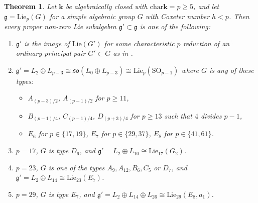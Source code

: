 \documentclass[11pt,a4paper,reqno]{amsart}
\newtheorem{theorem}[subsection]{Theorem}
\theoremstyle{definition}
\newcommand{\bk}{\mathbf{k}}
\numberwithin{equation}{section}
\newcommand{\charr}{\mathrm{char}}
\newcommand{\fg}{\mathfrak{g}}
\newcommand{\fso}{\mathfrak{so}}
\newcommand{\Lie}{\mathrm{Lie}}
\newcommand{\SO}{\mathrm{SO}}
\begin{document}
\begin{theorem}\label{ThmSubalgs}
Let $\bk$ be algebraically closed with $\charr\bk=p\geq5$, and let $\fg=\Lie_p(G)$ for a simple algebraic group $G$ with Coxeter number $h<p$. Then every proper non-zero Lie subalgebra $\fg'\subset\fg$ is one of the following:
\begin{enumerate}
\item\label{Item1P} $\fg'$ is the image of $\Lie(G')$ for some characteristic $p$ reduction of an ordinary principal pair $G'\subset G$ as in \cite[Theorem~6.4]{EO}.
\item\label{Item1D} $\fg'=L_2\oplus L_{p-3}\cong\fso(L_0\oplus L_{p-3})\cong\Lie_p(\SO_{p-1})$ where $G$ is any of these types:
\begin{itemize}
\item $A_{(p-3)/2}$, $A_{(p-1)/2}$ for $p\geq11$,
\item $B_{(p-1)/4}$, $C_{(p-1)/4}$, $D_{(p+3)/4}$ for $p\geq13$ such that $4$ divides $p-1$,
\item $E_6$ for $p\in\{17,19\}$, $E_7$ for $p\in\{29,37\}$, $E_8$ for $p\in\{41,61\}$.
\end{itemize}
\item\label{Item1G} $p=17$, $G$ is type $D_6$, and $\fg'=L_2\oplus L_{10}\cong\Lie_{17}(G_2)$.
\item\label{Item1E7} $p=23$, $G$ is one of the types $A_9,A_{12},B_6,C_5$ or $D_7$, and $\fg'=L_2\oplus L_{14}\cong\Lie_{23}(E_7)$.
\item\label{Item1E8} $p=29$, $G$ is type $E_7$, and $\fg'=L_2\oplus L_{14}\oplus L_{26}\cong\Lie_{29}(E_8,a_1)$.
\end{enumerate}
\end{theorem}
\end{document}
